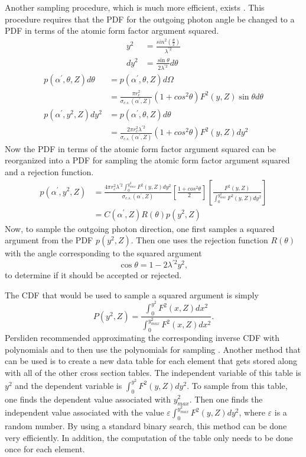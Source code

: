 Another sampling procedure, which is much more efficient, exists
\citep{persliden_monte_1983}. This procedure requires that the PDF for the 
outgoing photon angle be changed to a PDF in terms of the atomic form factor 
argument squared.
\begin{align}
  y^2 & = \frac{sin^2\left(\frac{\theta}{2} \right)}{\lambda^{'2}} \\
  dy^2 & = \frac{\sin{\theta}}{2\lambda^{'2}} d\theta \nonumber
\end{align}
\begin{align}
  p(\alpha^{'},\theta,Z)d\theta & = p(\alpha^{'},\theta,Z)d\Omega \nonumber \\
  & = \frac{\pi r_e^2}{\sigma_{c.s.}(\alpha^{'},Z)}(1 + cos^2\theta) F^2(y,Z) 
  \sin{\theta} d\theta \nonumber \\
  p(\alpha^{'},y^2,Z)dy^2 & = p(\alpha^{'},\theta,Z)d\theta \nonumber \\
  & = \frac{2\pi r_e^2 \lambda^{'2}}{\sigma_{c.s.}(\alpha^{'},Z)}
  (1 + cos^2\theta)F^2(y,Z) dy^2 
\end{align}
Now the PDF in terms of the atomic form factor argument squared can be 
reorganized into a PDF for sampling the atomic form factor argument squared
and a rejection function.
\begin{align}
  p(\alpha^{'},y^2,Z) & = 
  \frac{4\pi r_e^2 \lambda^{'2} \int_0^{y_{max}^2}F^2(y,Z)dy^2}
  {\sigma_{c.s.}(\alpha^{'},Z)} \left[\frac{1+cos^2\theta}{2} \right]
  \left[\frac{F^2(y,Z)}{\int_0^{y_{max}^2}F^2(y,Z)dy^2} \right] \nonumber \\
  & = C(\alpha^{'},Z)R(\theta)p(y^2,Z)
\end{align}
Now, to sample the outgoing photon direction, one first samples a squared
argument from the PDF $p(y^2,Z)$. Then one uses the rejection function 
$R(\theta)$ with the angle corresponding to the squared argument
\begin{equation}
  \cos{\theta} = 1 - 2\lambda^{'2}y^2,
\end{equation}
to determine if it should be accepted or rejected.

The CDF that would be used to sample a squared argument is simply
\begin{equation}
  P(y^2,Z) = \frac{\int_0^{y^2}F^2(x,Z)dx^2}{\int_0^{y_{max}^2}F^2(x,Z)dx^2}.
\end{equation}
Persliden recommended approximating the corresponding inverse CDF with 
polynomials and to then use the polynomials for sampling 
\citep{persliden_monte_1983}. Another method that can be used is to create a 
new data table for each element that gets stored along with all of the other 
cross section tables. The independent variable of this table is $y^2$ and the
dependent variable is $\int_0^{y^2}F^2(y,Z)dy^2$. To sample from this table, one
finds the dependent value associated with $y_{max}^2$. Then one finds the 
independent value associated with the value 
$\varepsilon \int_0^{y_{max}^2}F^2(y,Z)dy^2$, where $\varepsilon$ is a random 
number. By using a standard binary search, this method can be done very 
efficiently. In addition, the computation of the table only needs to be done 
once for each element.

